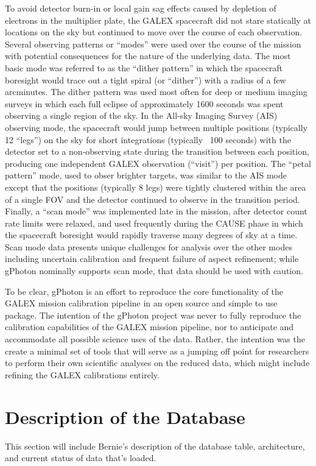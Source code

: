 \documentclass[preprint]{aastex}
\begin{document}
To avoid detector burn-in or local gain sag effects caused by depletion of electrons in the multiplier plate, the GALEX spacecraft did not stare statically at locations on the sky but continued to move over the course of each observation. Several observing patterns or “modes” were used over the course of the mission with potential consequences for the nature of the underlying data. The most basic mode was referred to as the “dither pattern” in which the spacecraft boresight would trace out a tight spiral (or “dither”) with a radius of a few arcminutes. The dither pattern was used most often for deep or medium imaging surveys in which each full eclipse of approximately 1600 seconds was spent observing a single region of the sky. In the All-sky Imaging Survey (AIS) observing mode, the spacecraft would jump between multiple positions (typically 12 “legs”) on the sky for short integrations (typically ~100 seconds) with the detector set to a non-observing state during the transition between each position, producing one independent GALEX observation (“visit”) per position. The “petal pattern” mode, used to obser brighter targets, was similar to the AIS mode except that the positions (typically 8 legs) were tightly clustered within the area of a single FOV and the detector continued to observe in the transition period. Finally, a “scan mode” was implemented late in the mission, after detector count rate limits were relaxed, and used frequently during the CAUSE phase in which the spacecraft boresight would rapidly traverse many degrees of sky at a time. Scan mode data presents unique challenges for analysis over the other modes including uncertain calibration and frequent failure of aspect refinement; while gPhoton nominally supports scan mode, that data should be used with caution.

To be clear, gPhoton is an effort to reproduce the core functionality of the GALEX mission calibration pipeline in an open source and simple to use package. The intention of the gPhoton project was never to fully reproduce the calibration capabilities of the GALEX mission pipeline, nor to anticipate and accommodate all possible science uses of the data. Rather, the intention was the create a minimal set of tools that will serve as a jumping off point for researchers to perform their own scientific analyses on the reduced data, which might include refining the GALEX calibrations entirely.

\section{Description of the Database}
\label{database}
This section will include Bernie's description of the database table, architecture, and current status of data that's loaded.
\end{document}
